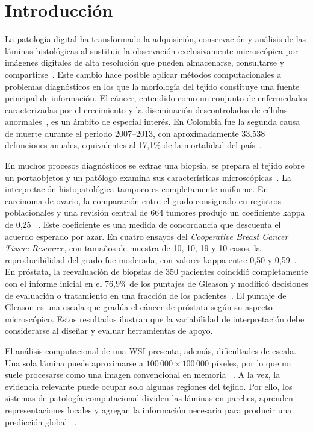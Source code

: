 \chapter*{Introducción}

La patología digital ha transformado la adquisición, conservación y análisis de
las láminas histológicas al sustituir la observación exclusivamente microscópica
por imágenes digitales de alta resolución que pueden almacenarse, consultarse y
compartirse~\cite{pallua_future_2020,song_artificial_2023}. Este cambio hace
posible aplicar métodos computacionales a problemas diagnósticos en los que la
morfología del tejido constituye una fuente principal de información. El cáncer,
entendido como un conjunto de enfermedades caracterizadas por el crecimiento y
la diseminación descontrolados de células anormales~\cite{nci_what_is_cancer}, es
un ámbito de especial interés. En Colombia fue la segunda causa de muerte durante
el periodo 2007--2013, con aproximadamente 33.538 defunciones anuales, equivalentes
al 17,1\% de la mortalidad del país~\cite{pardo_c_atlas_2017}.

En muchos procesos diagnósticos se extrae una biopsia, se prepara el tejido sobre
un portaobjetos y un patólogo examina sus características microscópicas~\cite{nci_cancer_diagnosis}. La interpretación
histopatológica tampoco es completamente uniforme. En carcinoma de ovario, la
comparación entre el grado consignado en registros poblacionales y una revisión
central de 664 tumores produjo un coeficiente kappa de 0,25
~\cite{matsuno_agreement_2013}. Este coeficiente es una medida de concordancia
que descuenta el acuerdo esperado por azar. En cuatro ensayos del \emph{Cooperative Breast
Cancer Tissue Resource}, con tamaños de muestra de 10, 10, 19 y 10 casos, la
reproducibilidad del grado fue moderada, con valores kappa entre 0,50 y
0,59~\cite{meyer_breast_2005}. En próstata, la reevaluación de biopsias de 350
pacientes coincidió completamente con el informe inicial en el 76,9\% de los
puntajes de Gleason y modificó decisiones de evaluación o tratamiento en una
fracción de los pacientes~\cite{berg_prostate_2011}. El puntaje de Gleason es
una escala que gradúa el cáncer de próstata según su aspecto microscópico.
Estos resultados ilustran
que la variabilidad de interpretación debe considerarse al diseñar y evaluar
herramientas de apoyo.

El análisis computacional de una WSI presenta, además, dificultades de escala.
Una sola lámina puede aproximarse a \(100\,000\times100\,000\) píxeles, por lo
que no suele procesarse como una imagen convencional en memoria
~\cite{wang_managing_2012}. A la vez, la evidencia relevante puede ocupar solo
algunas regiones del tejido. Por ello, los sistemas de patología computacional
dividen las láminas en parches, aprenden representaciones locales y agregan la
información necesaria para producir una predicción global
~\cite{niazi_digital_2019,song_artificial_2023}.

